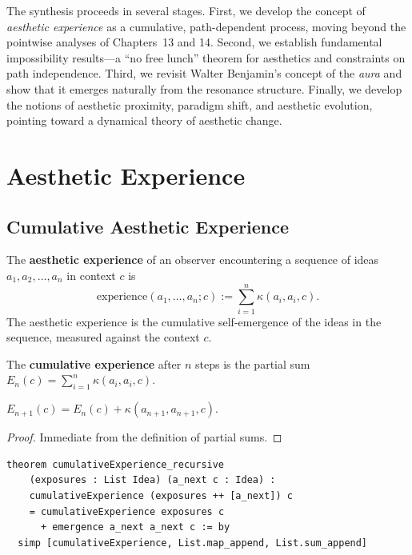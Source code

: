 The synthesis proceeds in several stages.  First, we develop the concept
of \emph{aesthetic experience} as a cumulative, path-dependent process,
moving beyond the pointwise analyses of Chapters~13 and 14.  Second, we
establish fundamental impossibility results---a ``no free lunch'' theorem
for aesthetics and constraints on path independence.  Third, we revisit
Walter Benjamin's concept of the \emph{aura} and show that it emerges
naturally from the resonance structure.  Finally, we develop the notions
of aesthetic proximity, paradigm shift, and aesthetic evolution, pointing
toward a dynamical theory of aesthetic change.

\section{Aesthetic Experience}
\label{sec:math-aesthetics:experience}

\subsection{Cumulative Aesthetic Experience}

\begin{definition}
\label{def:aesthetic-experience}
The \textbf{aesthetic experience} of an observer encountering a sequence
of ideas $a_1, a_2, \ldots, a_n$ in context $c$ is
\[
  \mathrm{experience}(a_1, \ldots, a_n; c)
    := \sum_{i=1}^{n} \kappa(a_i, a_i, c).
\]
The aesthetic experience is the cumulative self-emergence of the ideas
in the sequence, measured against the context $c$.
\end{definition}

\begin{definition}
\label{def:cumulative-experience}
The \textbf{cumulative experience} after $n$ steps is the partial sum
$E_n(c) = \sum_{i=1}^{n} \kappa(a_i, a_i, c)$.
\end{definition}

\begin{theorem}
\label{thm:experience-recursive}
$E_{n+1}(c) = E_n(c) + \kappa(a_{n+1}, a_{n+1}, c)$.
\end{theorem}

\begin{proof}
Immediate from the definition of partial sums.
\end{proof}

\begin{lstlisting}
theorem cumulativeExperience_recursive
    (exposures : List Idea) (a_next c : Idea) :
    cumulativeExperience (exposures ++ [a_next]) c
    = cumulativeExperience exposures c
      + emergence a_next a_next c := by
  simp [cumulativeExperience, List.map_append, List.sum_append]
\end{lstlisting}

